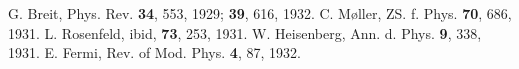 \begin{thebibliography}{4}
G. Breit, Phys. Rev. \textbf{34}, 553, 1929; \textbf{39}, 616, 1932.
C. Møller, ZS. f. Phys. \textbf{70}, 686, 1931.
L. Rosenfeld, ibid, \textbf{73}, 253, 1931.
W. Heisenberg, Ann. d. Phys. \textbf{9}, 338, 1931.
E. Fermi, Rev. of Mod. Phys. \textbf{4}, 87, 1932.
\end{thebibliography}